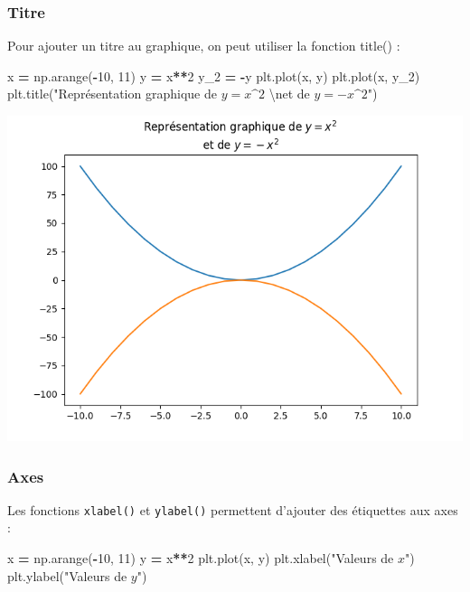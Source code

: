 \documentclass[
  12pt,
]{book}
\newenvironment{Shaded}{\begin{snugshade}}{\end{snugshade}}
\newcommand{\CharTok}[1]{\textcolor[rgb]{0.31,0.60,0.02}{#1}}
\newcommand{\DecValTok}[1]{\textcolor[rgb]{0.00,0.00,0.81}{#1}}
\newcommand{\NormalTok}[1]{#1}
\newcommand{\OperatorTok}[1]{\textcolor[rgb]{0.81,0.36,0.00}{\textbf{#1}}}
\newcommand{\StringTok}[1]{\textcolor[rgb]{0.31,0.60,0.02}{#1}}
\numberwithin{equation}{section}
\numberwithin{countremarque}{section}
\begin{document}
\subsubsection{Titre}\label{titre}

Pour ajouter un titre au graphique, on peut utiliser la fonction title() :

\begin{Shaded}
\begin{Highlighting}[]
\NormalTok{x }\OperatorTok{=}\NormalTok{ np.arange(}\OperatorTok{{-}}\DecValTok{10}\NormalTok{, }\DecValTok{11}\NormalTok{)}
\NormalTok{y }\OperatorTok{=}\NormalTok{ x}\OperatorTok{**}\DecValTok{2}
\NormalTok{y\_2 }\OperatorTok{=} \OperatorTok{{-}}\NormalTok{y}
\NormalTok{plt.plot(x, y)}
\NormalTok{plt.plot(x, y\_2)}
\NormalTok{plt.title(}\StringTok{"Représentation graphique de $y = x\^{}2$ }\CharTok{\textbackslash{}n}\StringTok{et de $y = {-}x\^{}2$"}\NormalTok{)}
\end{Highlighting}
\end{Shaded}

\begin{center}\includegraphics[width=9.03in]{figs/pyplot/plot_titre} \end{center}

\subsubsection{Axes}\label{axes}

Les fonctions \texttt{xlabel()} et \texttt{ylabel()} permettent d'ajouter des étiquettes aux axes :

\begin{Shaded}
\begin{Highlighting}[]
\NormalTok{x }\OperatorTok{=}\NormalTok{ np.arange(}\OperatorTok{{-}}\DecValTok{10}\NormalTok{, }\DecValTok{11}\NormalTok{)}
\NormalTok{y }\OperatorTok{=}\NormalTok{ x}\OperatorTok{**}\DecValTok{2}
\NormalTok{plt.plot(x, y)}
\NormalTok{plt.xlabel(}\StringTok{"Valeurs de $x$"}\NormalTok{)}
\NormalTok{plt.ylabel(}\StringTok{"Valeurs de $y$"}\NormalTok{)}
\end{Highlighting}
\end{Shaded}
\end{document}
